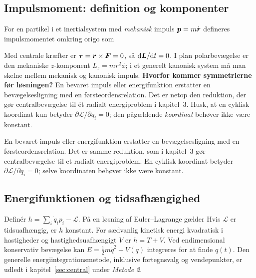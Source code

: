 \subsection{Impulsmoment: definition og komponenter}\label{sec:angular}
For en partikel i et inertialsystem med \emph{mekanisk} impuls $\boldsymbol{p}=m\dot{\boldsymbol{r}}$ defineres impulsmomentet omkring origo som
\begin{center}\end{center}
Med centrale kræfter er $\boldsymbol{\tau}=\boldsymbol{r}\times\boldsymbol{F}=0$, så $\mathrm d\boldsymbol{L}/\mathrm d t=0$. I plan polarbevægelse er den mekaniske $z$-komponent $L_z=mr^2\dot\phi$; i et generelt kanonisk system må man skelne mellem mekanisk og kanonisk impuls.
\textbf{Hvorfor kommer symmetrierne før løsningen?}
En bevaret impuls eller energifunktion erstatter en bevægelsesligning med en førsteordensrelation. Det er netop den reduktion, der gør centralbevægelse til ét radialt energiproblem i kapitel~3. Husk, at en cyklisk koordinat kun betyder $\partial\mathcal L/\partial q_i=0$; den pågældende \emph{koordinat} behøver ikke være konstant.

En bevaret impuls eller energifunktion erstatter en bevægelsesligning med en førsteordensrelation. Det er samme reduktion, som i kapitel~3 gør centralbevægelse til et radialt energiproblem. En cyklisk koordinat betyder $\partial\mathcal L/\partial q_i=0$; selve koordinaten behøver ikke være konstant.

\subsection{Energifunktionen og tidsafhængighed}
Definér $h=\sum_i\dot q_i p_i-\mathcal L$. På en løsning af Euler--Lagrange gælder
Hvis $\mathcal L$ er tidsuafhængig, er $h$ konstant. For sædvanlig kinetisk energi kvadratisk i hastigheder og hastighedsuafhængigt $V$ er $h=T+V$.
Ved endimensional konservativ bevægelse kan $E=\frac12m\dot q^2+V(q)$ integreres for at finde $q(t)$. Den generelle energiintegrationsmetode, inklusive fortegnsvalg og vendepunkter, er udledt i kapitel~\ref{sec:central} under \emph{Metode 2}.
